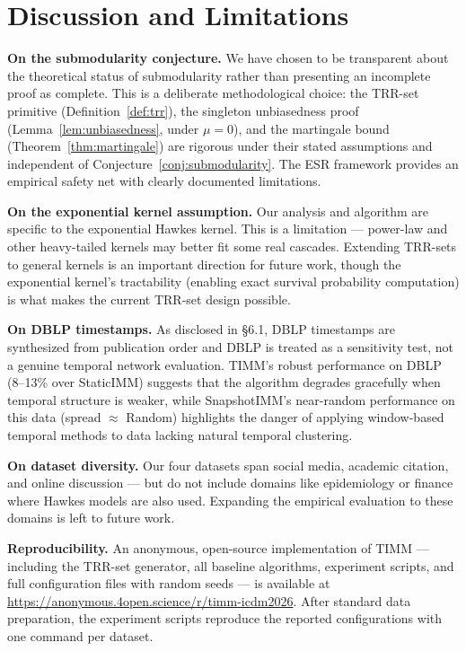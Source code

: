 \documentclass[10pt,conference]{IEEEtran}
\begin{document}
\section{Discussion and Limitations}

\textbf{On the submodularity conjecture.}
We have chosen to be transparent about the theoretical status of submodularity rather than presenting an incomplete proof as complete.
This is a deliberate methodological choice: the TRR-set primitive (Definition~\ref{def:trr}), the singleton unbiasedness proof (Lemma~\ref{lem:unbiasedness}, under $\mu{=}0$), and the martingale bound (Theorem~\ref{thm:martingale}) are rigorous under their stated assumptions and independent of Conjecture~\ref{conj:submodularity}.
The ESR framework provides an empirical safety net with clearly documented limitations.

\textbf{On the exponential kernel assumption.}
Our analysis and algorithm are specific to the exponential Hawkes kernel.
This is a limitation — power-law and other heavy-tailed kernels may better fit some real cascades.
Extending TRR-sets to general kernels is an important direction for future work, though the exponential kernel's tractability (enabling exact survival probability computation) is what makes the current TRR-set design possible.

\textbf{On DBLP timestamps.}
As disclosed in \S6.1, DBLP timestamps are synthesized from publication order and DBLP is treated as a sensitivity test, not a genuine temporal network evaluation.
TIMM's robust performance on DBLP (8--13\% over StaticIMM) suggests that the algorithm degrades gracefully when temporal structure is weaker, while SnapshotIMM's near-random performance on this data (spread $\approx$ Random) highlights the danger of applying window-based temporal methods to data lacking natural temporal clustering.

\textbf{On dataset diversity.}
Our four datasets span social media, academic citation, and online discussion — but do not include domains like epidemiology or finance where Hawkes models are also used.
Expanding the empirical evaluation to these domains is left to future work.

\textbf{Reproducibility.}
An anonymous, open-source implementation of TIMM — including the TRR-set generator, all baseline algorithms, experiment scripts, and full configuration files with random seeds — is available at \url{https://anonymous.4open.science/r/timm-icdm2026}. After standard data preparation, the experiment scripts reproduce the reported configurations with one command per dataset.
\end{document}
